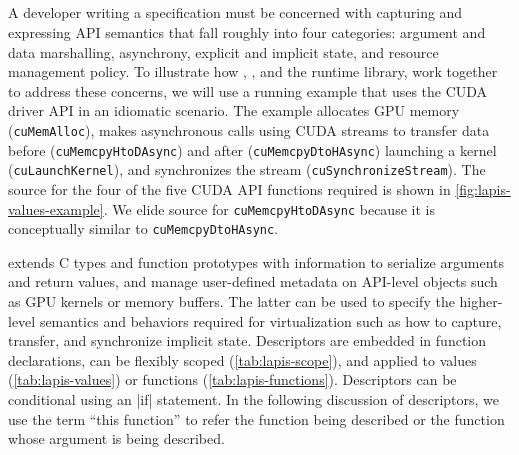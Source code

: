 {%




\subsection{\Speclang}

A developer writing a \speclang specification must be concerned with
capturing and expressing API semantics that fall roughly into four categories:
argument and data marshalling, asynchrony, explicit and implicit state,
and resource management policy.
To illustrate how \compiler, \speclang, and the runtime library,
work together to address these concerns, we will use a running example that
uses the CUDA driver API in an idiomatic scenario. The example allocates GPU memory (\texttt{cuMemAlloc}), makes
asynchronous calls using CUDA streams to transfer data before (\texttt{cuMemcpyHtoDAsync}) and after (\texttt{cuMemcpyDtoHAsync}) launching a kernel (\texttt{cuLaunch\-Kernel}),
and synchronizes the stream (\texttt{cuSynchronize\-Stream}).
The \speclang source for the four of the five CUDA API functions required is shown in \autoref{fig:lapis-values-example}. We
elide source for \texttt{cuMemcpyHtoDAsync} because it is conceptually similar to \texttt{cuMemcpyDtoHAsync}.

\speclang extends C types and function prototypes with information to serialize arguments and return values,
and manage user-defined metadata on API-level objects such as GPU kernels or memory buffers. The latter can be used to
specify the higher-level semantics and behaviors required for virtualization such as how to capture, transfer, and synchronize implicit state.
Descriptors are embedded in \speclang function declarations,
can be flexibly scoped (\autoref{tab:lapis-scope}), and
applied to values (\autoref{tab:lapis-values}) or functions (\autoref{tab:lapis-functions}).
Descriptors can be conditional using an \spec|if| statement.
In the following discussion of \speclang descriptors, we use the term ``this function'' to refer the function
being described or the function whose argument is being described.

}
